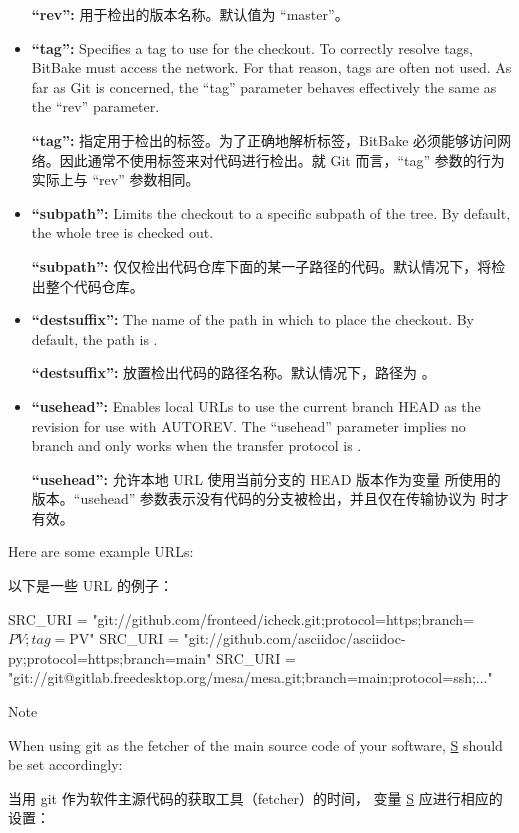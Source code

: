\begin{itemize}
\medskip
\textbf{``rev'':} 用于检出的版本名称。默认值为 ``master''。

\item \textbf{``tag'':} Specifies a tag to use for the checkout. To correctly resolve tags, BitBake must access the network. For that reason, tags are often not used. As far as Git is concerned, the ``tag'' parameter behaves effectively the same as the ``rev'' parameter.

\medskip
\textbf{``tag'':} 指定用于检出的标签。为了正确地解析标签，BitBake 必须能够访问网络。因此通常不使用标签来对代码进行检出。就 Git 而言，``tag'' 参数的行为实际上与 ``rev'' 参数相同。


\item \textbf{``subpath'':} Limits the checkout to a specific subpath of the tree. By default, the whole tree is checked out.

\medskip
\textbf{``subpath'':} 仅仅检出代码仓库下面的某一子路径的代码。默认情况下，将检出整个代码仓库。

\item \textbf{``destsuffix'':} The name of the path in which to place the checkout. By default, the path is .

\medskip
\textbf{``destsuffix'':} 放置检出代码的路径名称。默认情况下，路径为 。

\item \textbf{``usehead'':} Enables local  URLs to use the current branch HEAD as the revision for use with AUTOREV. The ``usehead'' parameter implies no branch and only works when the transfer protocol is .

\medskip
\textbf{``usehead'':} 允许本地  URL 使用当前分支的 HEAD 版本作为变量  所使用的版本。“usehead” 参数表示没有代码的分支被检出，并且仅在传输协议为  时才有效。
\end{itemize}

Here are some example URLs:

以下是一些 URL 的例子：

\begin{pyglist}
SRC_URI = "git://github.com/fronteed/icheck.git;protocol=https;branch=${PV};tag=${PV}"
SRC_URI = "git://github.com/asciidoc/asciidoc-py;protocol=https;branch=main"
SRC_URI = "git://git@gitlab.freedesktop.org/mesa/mesa.git;branch=main;protocol=ssh;..."
\end{pyglist}

\begin{noteblock}{Note}%

When using git as the fetcher of the main source code of your software, \href{https://docs.yoctoproject.org/ref-manual/variables.html#term-S}{S} should be set accordingly:

\medskip
当用 git 作为软件主源代码的获取工具（fetcher）的时间， 变量 \href{https://docs.yoctoproject.org/ref-manual/variables.html#term-S}{S} 应进行相应的设置：


\end{noteblock}

